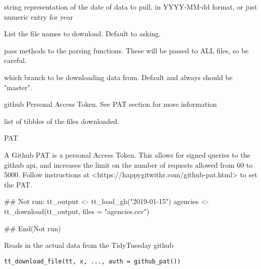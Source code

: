 \documentclass[letterpaper]{book}
\begin{document}
\begin{Arguments}
\begin{ldescription}
\item[\code{tt}] string representation of the date of data to pull, in YYYY-MM-dd
format, or just numeric entry for year

\item[\code{files}] List the file names to download. Default to asking.

\item[\code{...}] pass methods to the parsing functions. These will be passed to
ALL files, so be careful.

\item[\code{branch}] which branch to be downloading data from. Default and always
should be "master".

\item[\code{auth}] github Personal Access Token. See PAT section for more
information
\end{ldescription}
\end{Arguments}
%
\begin{Value}
list of tibbles of the files downloaded.
\end{Value}
%
\begin{Section}{PAT}


A Github PAT is a personal Access Token. This allows for signed queries to
the github api, and increases the limit on the number of requests allowed
from 60 to 5000. Follow instructions at
<https://happygitwithr.com/github-pat.html> to set the PAT.
\end{Section}
%
\begin{Examples}
\begin{ExampleCode}
## Not run:
tt_output <- tt_load_gh("2019-01-15")
agencies <- tt_download(tt_output, files = "agencies.csv")

## End(Not run)
\end{ExampleCode}
\end{Examples}
%
\begin{Description}\relax
Reads in the actual data from the TidyTuesday github
\end{Description}
%
\begin{Usage}
\begin{verbatim}
tt_download_file(tt, x, ..., auth = github_pat())
\end{verbatim}
\end{Usage}
\end{document}
